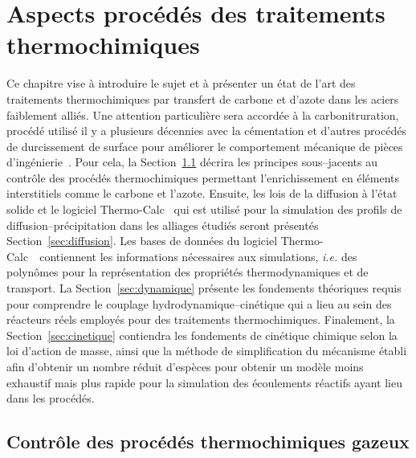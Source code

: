\chapter{Aspects procédés des traitements thermochimiques}
\label{ch:aspects_procedes}

\vfill

Ce chapitre vise à introduire le sujet et à présenter un état de l'art des traitements thermochimiques par transfert de carbone et d'azote dans les aciers faiblement alliés. Une attention particulière sera accordée à la carbonitruration, procédé utilisé il y a plusieurs décennies avec la cémentation et d'autres procédés de durcissement de surface pour améliorer le comportement mécanique de pièces d'ingénierie~\cite{Slycke1981i}. Pour cela, la Section~\ref{sec:procedes} décrira les principes sous--jacents au contrôle des procédés thermochimiques permettant l'enrichissement en éléments interstitiels comme le carbone et l'azote. Ensuite, les lois de la diffusion à l'état solide et le logiciel Thermo-Calc~\cite{Andersson2002,Borgenstam2000} qui est utilisé pour la simulation des profils de diffusion--précipitation dans les alliages étudiés seront présentés Section~\ref{sec:diffusion}. Les bases de données du logiciel Thermo-Calc~\cite{Andersson2002,Borgenstam2000} contiennent les informations nécessaires aux simulations, \emph{i.e.} des polynômes pour la représentation des propriétés thermodynamiques et de transport. La Section~\ref{sec:dynamique} présente les fondements théoriques requis pour comprendre le couplage hydrodynamique--cinétique qui a lieu au sein des réacteurs réels employés pour des traitements thermochimiques. Finalement, la Section~\ref{sec:cinetique} contiendra les fondements de cinétique chimique selon la loi d'action de masse, ainsi que la méthode de simplification du mécanisme établi afin d'obtenir un nombre réduit d'espèces pour obtenir un modèle moins exhaustif mais plus rapide pour la simulation des écoulements réactifs ayant lieu dans les procédés. 

\vfill\clearpage

\section{Contrôle des procédés thermochimiques gazeux}
\label{sec:procedes}

